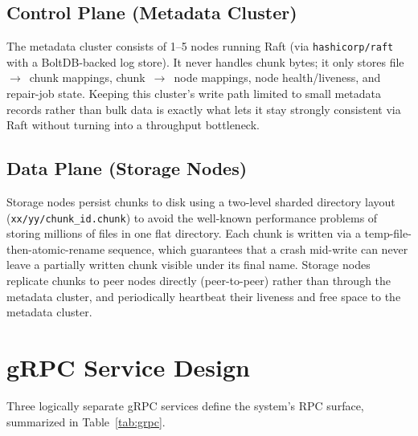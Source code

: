 \documentclass[12pt,a4paper]{report}
\begin{document}
\subsection{Control Plane (Metadata Cluster)}
The metadata cluster consists of 1--5 nodes running Raft (via \texttt{hashicorp/raft} with a BoltDB-backed log store). It never handles chunk bytes; it only stores file~$\rightarrow$~chunk mappings, chunk~$\rightarrow$~node mappings, node health/liveness, and repair-job state. Keeping this cluster's write path limited to small metadata records rather than bulk data is exactly what lets it stay strongly consistent via Raft without turning into a throughput bottleneck.

\subsection{Data Plane (Storage Nodes)}
Storage nodes persist chunks to disk using a two-level sharded directory layout (\texttt{xx/yy/chunk\_id.chunk}) to avoid the well-known performance problems of storing millions of files in one flat directory. Each chunk is written via a temp-file-then-atomic-rename sequence, which guarantees that a crash mid-write can never leave a partially written chunk visible under its final name. Storage nodes replicate chunks to peer nodes directly (peer-to-peer) rather than through the metadata cluster, and periodically heartbeat their liveness and free space to the metadata cluster.

\section{gRPC Service Design}

Three logically separate gRPC services define the system's RPC surface, summarized in Table~\ref{tab:grpc}.
\end{document}
